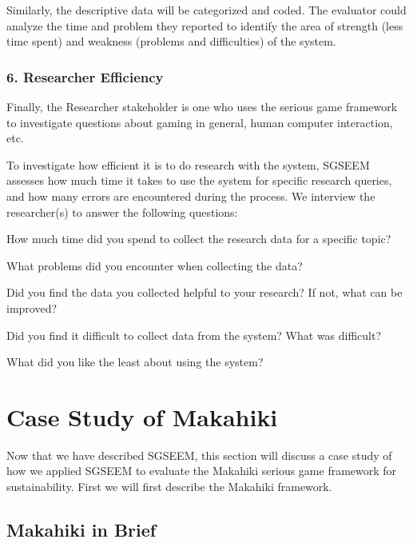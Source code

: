 \documentclass{sigchi}
\begin{document}
Similarly, the descriptive data will be categorized and coded. The evaluator could analyze
 the time and problem they reported to identify the area of strength (less time spent) and weakness (problems and difficulties) of the system.

\subsubsection{6. Researcher Efficiency}

Finally, the Researcher stakeholder is one who uses the serious game framework to
investigate questions about gaming in general, human computer interaction, etc. 

To investigate how efficient it is to do research with the system, SGSEEM
assesses how much time it takes to use the system for specific research
queries, and how many errors are encountered during the process. We
interview the researcher(s) to answer the following questions:
\begin{compactitem}
\item How much time did you spend to collect the research data for a
  specific topic?
\item What problems did you encounter when collecting the data?
\item Did you find the data you collected helpful to your research? If
  not, what can be improved?
\item Did you find it difficult to collect data from the system?
  What was difficult?
\item What did you like the least about using the system?
\end{compactitem}


\section{Case Study of Makahiki}

Now that we have described SGSEEM, this section will discuss
a case study of how we applied SGSEEM to evaluate the Makahiki serious
game framework for sustainability. First we will first describe the
Makahiki framework.

\subsection{Makahiki in Brief}
\end{document}

